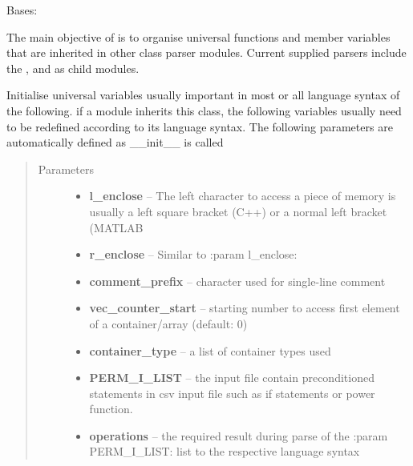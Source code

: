 \documentclass[letterpaper,10pt,english]{sphinxmanual}
\begin{document}
\begin{fulllineitems}
\label{eqparse:eqparse.baseparse.BaseParse}
Bases: 

The main objective of {\hyperref[eqparse:eqparse.baseparse.BaseParse]{}} is to organise universal
functions and member variables that are inherited in other class 
parser modules. Current supplied parsers include the ,
 and  as child modules.

Initialise universal variables usually important in most or all
language syntax of the following. if a module inherits this class, 
the following variables usually need to be redefined according to its
language syntax. The following parameters are automatically defined as
\_\_init\_\_ is called
\begin{quote}\begin{description}
\item[{Parameters}] \leavevmode\begin{itemize}
\item {} 
\textbf{l\_enclose} -- The left character to access a piece of memory is usually a left square bracket (C++) or a  normal left bracket (MATLAB

\item {} 
\textbf{r\_enclose} -- Similar to :param l\_enclose:

\item {} 
\textbf{comment\_prefix} -- character used for single-line comment

\item {} 
\textbf{vec\_counter\_start} -- starting number to access first element of a container/array (default: 0)

\item {} 
\textbf{container\_type} -- a list of container types used

\item {} 
\textbf{PERM\_I\_LIST} -- the input file contain preconditioned statements in csv input file such as if statements or power function.

\item {} 
\textbf{operations} -- the required result during parse of the :param PERM\_I\_LIST: list to the respective language syntax

\end{itemize}

\end{description}\end{quote}


\end{fulllineitems}
\end{document}
